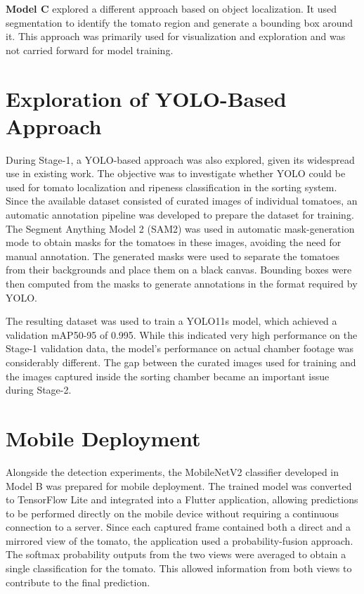 \documentclass[12pt,a4paper]{report}
\begin{document}
\textbf{Model C} explored a different approach based on object localization. It used segmentation to identify the tomato region and generate a bounding box around it. This approach was primarily used for visualization and exploration and was not carried forward for model training.

\section{Exploration of YOLO-Based Approach}

During Stage-1, a YOLO-based approach was also explored, given its widespread use in existing work. The objective was to investigate whether YOLO could be used for tomato localization and ripeness classification in the sorting system. Since the available dataset consisted of curated images of individual tomatoes, an automatic annotation pipeline was developed to prepare the dataset for training. The Segment Anything Model 2 (SAM2) was used in automatic mask-generation mode to obtain masks for the tomatoes in these images, avoiding the need for manual annotation. The generated masks were used to separate the tomatoes from their backgrounds and place them on a black canvas. Bounding boxes were then computed from the masks to generate annotations in the format required by YOLO.

The resulting dataset was used to train a YOLO11s model, which achieved a validation mAP50-95 of 0.995. While this indicated very high performance on the Stage-1 validation data, the model's performance on actual chamber footage was considerably different. The gap between the curated images used for training and the images captured inside the sorting chamber became an important issue during Stage-2.
\section{Mobile Deployment}

Alongside the detection experiments, the MobileNetV2 classifier developed in Model B was prepared for mobile deployment. The trained model was converted to TensorFlow Lite and integrated into a Flutter application, allowing predictions to be performed directly on the mobile device without requiring a continuous connection to a server. Since each captured frame contained both a direct and a mirrored view of the tomato, the application used a probability-fusion approach. The softmax probability outputs from the two views were averaged to obtain a single classification for the tomato. This allowed information from both views to contribute to the final prediction.
\end{document}
